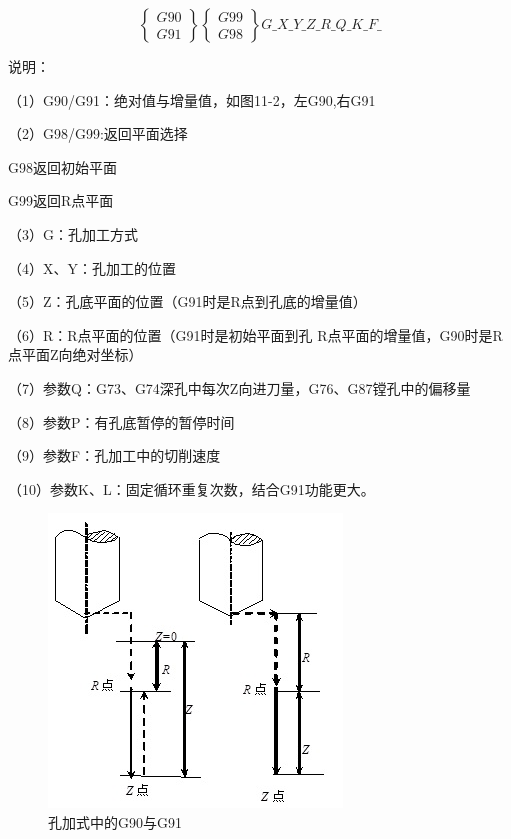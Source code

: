 \[ 
\left\lbrace 
\begin{array}{c}
G90 \\ G91
\end{array} 
\right\rbrace 
\left\lbrace 
\begin{array}{c}
G99 \\ G98
\end{array} 
\right\rbrace  
 G\_ X\_ Y\_ Z\_ R\_ Q\_ K\_ F\_    \]

说明：

（1）G90/G91：绝对值与增量值，如图11-2，左G90,右G91

（2）G98/G99:返回平面选择

G98返回初始平面

G99返回R点平面

（3）G：孔加工方式

（4）X、Y：孔加工的位置

（5）Z：孔底平面的位置（G91时是R点到孔底的增量值）

（6）R：R点平面的位置（G91时是初始平面到孔
R点平面的增量值，G90时是R点平面Z向绝对坐标）

（7）参数Q：G73、G74深孔中每次Z向进刀量，G76、G87镗孔中的偏移量

（8）参数P：有孔底暂停的暂停时间

（9）参数F：孔加工中的切削速度

（10）参数K、L：固定循环重复次数，结合G91功能更大。

\begin{figure}[h]
	\centering
	\includegraphics[width=0.7\linewidth]{data/image/21-1}
	\caption{孔加式中的G90与G91}
	\label{fig:21-1}
\end{figure}

